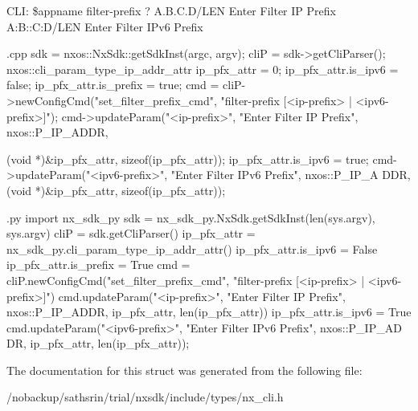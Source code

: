 CLI: \$appname filter-\/prefix ? A.B.C.D/LEN Enter Filter IP Prefix A:B::C:D/LEN Enter Filter IPv6 Prefix


\begin{DoxyCode}
 {.cpp}
       sdk = nxos::NxSdk::getSdkInst(argc, argv);
       cliP = sdk->getCliParser();
       nxos::cli_param_type_ip_addr_attr ip_pfx_attr = {0};
       ip_pfx_attr.is_ipv6 = false;
       ip_pfx_attr.is_prefix = true;
       cmd = cliP->newConfigCmd("set_filter_prefix_cmd",
                                "filter-prefix [<ip-prefix> | <ipv6-prefix>]");
       cmd->updateParam("<ip-prefix>", "Enter Filter IP Prefix", nxos::P_IP_ADDR,
      
                        (void *)&ip_pfx_attr, sizeof(ip_pfx_attr));
       ip_pfx_attr.is_ipv6 = true;
       cmd->updateParam("<ipv6-prefix>", "Enter Filter IPv6 Prefix", nxos::P_IP_A
      DDR,
                        (void *)&ip_pfx_attr, sizeof(ip_pfx_attr));
\end{DoxyCode}



\begin{DoxyCode}
 {.py}
       import nx_sdk_py
       sdk = nx_sdk_py.NxSdk.getSdkInst(len(sys.argv), sys.argv)
       cliP = sdk.getCliParser()
       ip_pfx_attr = nx_sdk_py.cli_param_type_ip_addr_attr()
       ip_pfx_attr.is_ipv6 = False
       ip_pfx_attr.is_prefix = True
       cmd = cliP.newConfigCmd("set_filter_prefix_cmd",
                               "filter-prefix [<ip-prefix> | <ipv6-prefix>]")
       cmd.updateParam("<ip-prefix>", "Enter Filter IP Prefix", nxos::P_IP_ADDR,
                       ip_pfx_attr, len(ip_pfx_attr))
       ip_pfx_attr.is_ipv6 = True
       cmd.updateParam("<ipv6-prefix>", "Enter Filter IPv6 Prefix", nxos::P_IP_AD
      DR,
                       ip_pfx_attr, len(ip_pfx_attr));
\end{DoxyCode}
 

The documentation for this struct was generated from the following file:\begin{DoxyCompactItemize}
\item 
/nobackup/sathsrin/trial/nxsdk/include/types/nx\_\-cli.h\end{DoxyCompactItemize}
